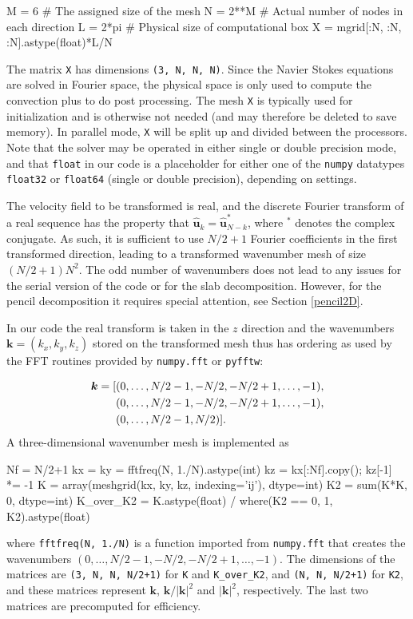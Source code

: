 \documentclass[final,1p,times]{elsarticle}
\newcommand{\inpyth}{\lstinline[style=inlinestyle]} %[]%
\begin{document}
\begin{python}
M = 6       # The assigned size of the mesh
N = 2**M    # Actual number of nodes in each direction
L = 2*pi    # Physical size of computational box
X = mgrid[:N, :N, :N].astype(float)*L/N
\end{python}
The matrix \inpyth{X} has dimensions \inpyth{(3, N, N, N)}. Since the Navier Stokes equations are solved in Fourier space, the physical space is only used to compute the convection plus to do post processing. The mesh \inpyth{X} is typically used for initialization and is otherwise not needed (and may therefore be deleted to save memory). In parallel mode, \inpyth{X} will be split up and divided between the processors.  Note that the solver may be operated in either single or double precision mode, and that \inpyth{float} in our code is a placeholder for either one of the \texttt{numpy} datatypes \inpyth{float32} or \inpyth{float64} (single or double precision), depending on settings.

The velocity field to be transformed is real, and the discrete Fourier transform of a real sequence has the property that $\hat{\bm{u}}_k = \hat{\bm{u}}_{N-k}^*$, where $^*$ denotes the complex conjugate. As such, it is sufficient to use $N/2+1$ Fourier coefficients in the first transformed direction, leading to a transformed wavenumber mesh of size $(N/2+1)N^2$. The odd number of wavenumbers does not lead to any issues for the serial version of the code or for the slab decomposition. However, for the pencil decomposition it requires special attention, see Section \ref{pencil2D}.

In our code the real transform is taken in the $z$ direction and the wavenumbers $\bm{k}=(k_x, k_y, k_z)$ stored on the transformed mesh thus has ordering as used by the FFT routines provided by \texttt{numpy.fft} or \texttt{pyfftw}:

\begin{align}
  \bm{k} = [&(0, \ldots, N/2-1, -N/2, -N/2+1, \ldots, -1), \notag \\
   &(0, \ldots, N/2-1, -N/2, -N/2+1, \ldots, -1),  \notag \\
  &(0, \ldots, N/2-1, N/2)].
\end{align}
A three-dimensional wavenumber mesh is implemented as

\begin{python}
Nf = N/2+1
kx = ky = fftfreq(N, 1./N).astype(int)
kz = kx[:Nf].copy(); kz[-1] *= -1
K = array(meshgrid(kx, ky, kz, indexing='ij'), dtype=int)
K2 = sum(K*K, 0, dtype=int)
K_over_K2 = K.astype(float) / where(K2 == 0, 1, K2).astype(float)
\end{python}
where \inpyth{fftfreq(N, 1./N)} is a function imported from \inpyth{numpy.fft} that creates the wavenumbers $(0, \ldots, N/2-1, -N/2, -N/2+1, \ldots, -1)$. The dimensions of the matrices are \inpyth{(3, N, N, N/2+1)} for \texttt{K} and \texttt{K\_over\_K2}, and \inpyth{(N, N, N/2+1)} for \texttt{K2}, and these matrices represent $\bm{k}$, $\bm{k}/|\bm{k}|^2$ and $|\bm{k}|^2$, respectively. The last two matrices are precomputed for efficiency.
\end{document}
